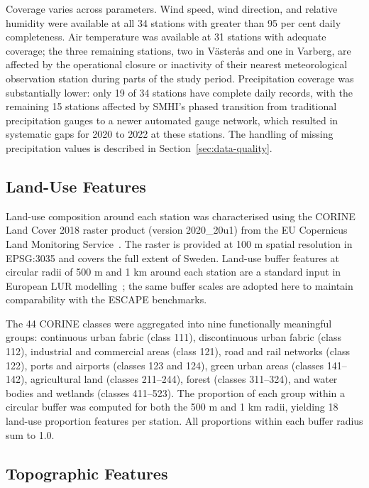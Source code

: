 \documentclass[11pt,a4paper]{article}
\let\oldsubsection\subsection
\renewcommand{\subsection}{\FloatBarrier\oldsubsection}
\begin{document}
Coverage varies across parameters. Wind speed, wind direction, and relative humidity were available at all 34 stations with greater than 95 per cent daily completeness. Air temperature was available at 31 stations with adequate coverage; the three remaining stations, two in Västerås and one in Varberg, are affected by the operational closure or inactivity of their nearest meteorological observation station during parts of the study period. Precipitation coverage was substantially lower: only 19 of 34 stations have complete daily records, with the remaining 15 stations affected by SMHI's phased transition from traditional precipitation gauges to a newer automated gauge network, which resulted in systematic gaps for 2020 to 2022 at these stations. The handling of missing precipitation values is described in Section~\ref{sec:data-quality}.

\subsection{Land-Use Features}
\label{sec:data-corine}

Land-use composition around each station was characterised using the CORINE Land Cover 2018 raster product (version 2020\_20u1) from the EU Copernicus Land Monitoring Service~\cite{corine_clc_2018}.
The raster is provided at 100 m spatial resolution in EPSG:3035 and covers the full extent of Sweden. Land-use buffer features at circular radii of 500 m and 1 km around each station are a standard input in European LUR modelling~\cite{hoek_lur_review_2008, eeftens_escape_pm_2012, wang_escape_no2_2013}; the same buffer scales are adopted here to maintain comparability with the ESCAPE benchmarks.

The 44 CORINE classes were aggregated into nine functionally meaningful groups: continuous urban fabric (class 111), discontinuous urban fabric (class 112), industrial and commercial areas (class 121), road and rail networks (class 122), ports and airports (classes 123 and 124), green urban areas (classes 141--142), agricultural land (classes 211--244), forest (classes 311--324), and water bodies and wetlands (classes 411--523). The proportion of each group within a circular buffer was computed for both the 500 m and 1 km radii, yielding 18 land-use proportion features per station. All proportions within each buffer radius sum to 1.0.

\subsection{Topographic Features}
\label{sec:data-dem}
\end{document}
